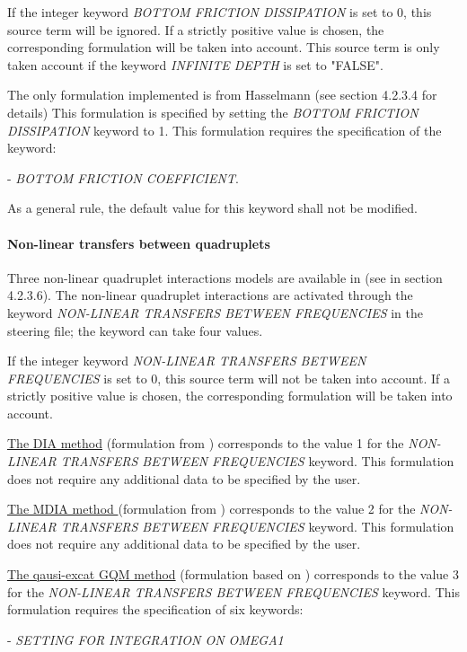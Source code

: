 If the integer keyword \textit{BOTTOM FRICTION DISSIPATION} is set to 0, this source term will be ignored. If a strictly positive
value is chosen, the corresponding formulation will be taken into account. This source term is only taken account if the keyword
\textit{INFINITE DEPTH} is set to "FALSE".

The only formulation implemented is from Hasselmann (see section 4.2.3.4 for details) This formulation is specified by setting the
\textit{BOTTOM FRICTION DISSIPATION} keyword to 1. This formulation requires the specification of the keyword:

  - \textit{BOTTOM FRICTION COEFFICIENT}.

 As a general rule, the default value for this keyword shall not be modified.


\paragraph{ Non-linear transfers between quadruplets}

Three non-linear quadruplet interactions models are available in \tomawac (see in section 4.2.3.6). The non-linear quadruplet
interactions are activated through the keyword \textit{NON-LINEAR TRANSFERS BETWEEN FREQUENCIES} in the steering file; the keyword
can take four values.

If the integer keyword \textit{NON-LINEAR TRANSFERS BETWEEN FREQUENCIES} is set to 0, this source term will not be taken into account.
If a strictly positive value is chosen, the corresponding formulation will be taken into account.

\underline{  The DIA method} (formulation from \cite{Hasselmann1985_1}) corresponds to the value 1 for the \textit{NON-LINEAR TRANSFERS
  BETWEEN FREQUENCIES} keyword. This formulation does not require any additional data to be specified by the user.

\underline{The MDIA method }(formulation from \cite{Tolman2004}) corresponds to the value 2 for the \textit{NON-LINEAR TRANSFERS
  BETWEEN FREQUENCIES} keyword. This formulation does not require any additional data to be specified by the user.

\underline{The qausi-excat GQM method} (formulation based on \cite{Lavrenov2001}) corresponds to the value 3 for the \textit{NON-LINEAR
  TRANSFERS BETWEEN FREQUENCIES} keyword. This formulation requires the specification of six keywords:

- \textit{SETTING FOR INTEGRATION ON OMEGA1}


